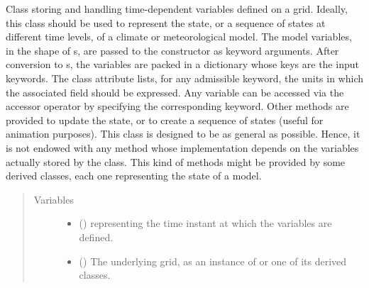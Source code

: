 \documentclass[letterpaper,10pt,english]{sphinxmanual}
\begin{document}
\begin{fulllineitems}
\label{\detokenize{api:storages.grid_data.GridData}}
Class storing and handling time-dependent variables defined on a grid. Ideally, this class should be used to
represent the state, or a sequence of states at different time levels, of a  climate or meteorological model.
The model variables, in the shape of s, are passed to the constructor as keyword arguments.
After conversion to s, the variables are packed in a dictionary whose keys are the input keywords.
The class attribute  lists, for any admissible keyword, the units in which the associated field should
be expressed. Any variable can be accessed via the accessor operator by specifying the corresponding
keyword. Other methods are provided to update the state, or to create a sequence of states (useful for animation purposes).
This class is designed to be as general as possible. Hence, it is not endowed with any method whose
implementation depends on the variables actually stored by the class. This kind of methods might be provided by some
derived classes, each one representing the state of a  model.
\begin{quote}\begin{description}
\item[{Variables}] \leavevmode\begin{itemize}
\item {} 
 () \textendash{}  representing the time instant at which the variables are defined.

\item {} 
 () \textendash{} The underlying grid, as an instance of {\hyperref[\detokenize{api:grids.grid_xyz.GridXYZ}]{}} or one of its derived classes.

\end{itemize}

\end{description}\end{quote}


\end{fulllineitems}
\end{document}
